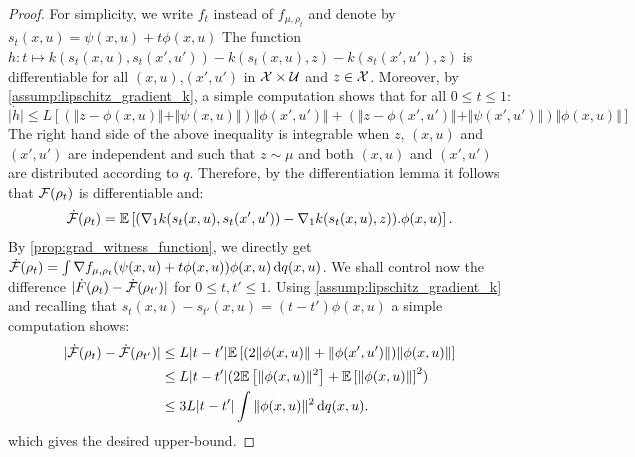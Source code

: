 \begin{proof}
For simplicity, we write $f_t$ instead of $f_{\mu,\rho_t}$ and denote by $s_t(x,u)= \psi(x,u)+t\phi(x,u)$
The function $h: t\mapsto k(s_t(x,u),s_t(x',u')) - k(s_t(x,u),z) - k(s_t(x',u'),z)$ is differentiable for all $(x,u)$,$(x',u')$ in ${{\mathcal X}}\times \mathcal{U}$ and $z\in {{\mathcal X}}$. 
Moreover, by \cref{assump:lipschitz_gradient_k}, a simple computation shows that for all $0\leq t\leq 1$:%
\[
\vert \dot{h} \vert \leq L\left[ (\Vert z - \phi(x,u)\Vert + \Vert \psi(x,u)\Vert) \Vert \phi(x',u')\Vert +  
(\Vert z - \phi(x',u')\Vert + \Vert \psi(x',u')\Vert )\Vert \phi(x,u)\Vert \right]
\]
The right hand side of the above inequality is integrable when $z$,  $(x,u)$ and  $(x',u')$ are independent and such that $z\sim \mu$ and both $(x,u)$ and $(x',u')$ are distributed according to $q$. Therefore, by the differentiation lemma \cite[Theorem 6.28]{Klenke:2008} it follows that ${{\mathcal F}}(\rho_t)$ is differentiable and:
\begin{align}\label{eq:time_derivative_mmd}
\dot{{{\mathcal F}}}(\rho_t) = \mathbb{E}\left[(\nabla_1 k(s_t(x,u),s_t(x',u'))-\nabla_1 k(s_t(x,u),z)).\phi(x,u)\right].
\end{align}
By \cref{prop:grad_witness_function}, we directly get $\dot{{{\mathcal F}}}(\rho_t) = \int \nabla f_{\mu,\rho_t}(\psi(x,u)+t\phi(x,u)) \phi(x,u)\mathop{}\!\mathrm{d} q(x,u)$.
 We shall control now the difference $\vert \dot{F}(\rho_t)-\dot{{{\mathcal F}}}(\rho_{t'})\vert$ for $0\leq t,t'\leq 1$. Using \cref{assump:lipschitz_gradient_k} and recalling that $s_t(x,u)-s_{t'}(x,u)= (t-t')\phi(x,u)$ a simple computation shows:
\begin{align*}
	\vert\dot{{{\mathcal F}}}(\rho_t)-\dot{{{\mathcal F}}}(\rho_{t'}) \vert 
	&\leq L\vert t-t' \vert \mathbb{E}\left[(2\Vert \phi(x,u) \Vert + \Vert \phi(x',u')\Vert )\Vert \phi(x,u)\Vert  \right]\\
	  &\leq L\vert t-t'\vert(2\mathbb{E}\left[\Vert \phi(x,u)\Vert^2 \right]  + \mathbb{E}\left[\Vert \phi(x,u)\Vert \right]^2)\\
	 &\leq 3L\vert t-t'\vert\int\Vert \phi(x,u)\Vert^2 \mathop{}\!\mathrm{d} q(x,u).
\end{align*}
which gives the desired upper-bound.
\end{proof}


